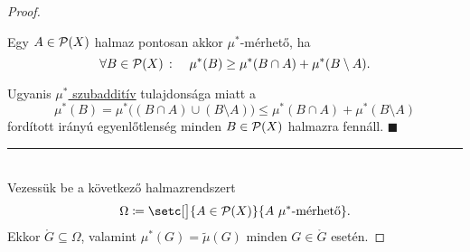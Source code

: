 \documentclass[
]{elteikthesis}[2024/04/26]
\begin{document}
\begin{proof}
		\begin{tcolorbox}[colback=green!10, colframe=green!80]
			\begin{lem*}\label{lem:mu-csillag-merheto}
				Egy \( A \in \mathcal{P}( X ) \) halmaz pontosan akkor \( \mu^* \)-mérhető, ha
				\[
					\forall B \in \mathcal{P}( X ) \ \colon \quad
					\mu^*(B) \geq \mu^*(B \cap A) + \mu^*(B \setminus A).
				\]
			\end{lem*}
		\end{tcolorbox}
		\begin{proof*}
			Ugyanis \hyperref[eq:mu-csillag-szubadditív]{\( \mu^* \) szubadditív} tulajdonsága miatt a
			\[
				\mu^*( B ) =
				\mu^* \bigl( (B \cap A) \cup (B \setminus A) \bigr) \leq
				\mu^*( B \cap A ) + \mu^*( B \setminus A )
			\]
			fordított irányú egyenlőtlenség minden \( B \in \mathcal{P}( X ) \) halmazra fennáll.
			\null\hfill \( \blacksquare \)
		\end{proof*}
		
		\noindent\rule{\linewidth}{0.4pt}\\
		
		Vezessük be a következő halmazrendszert
		\[
			\Omega \coloneq \setc[\big]{ A \in \powerset{X} }{ A \ \mu^* \text{-mérhető}}.
		\]
		Ekkor \( \ring{G} \subseteq \Omega \), 
		valamint \( \mu^*(G) = \widetilde{\mu}(G) \) minden \( G \in \ring{G} \) esetén.
		

\end{proof}
\end{document}
